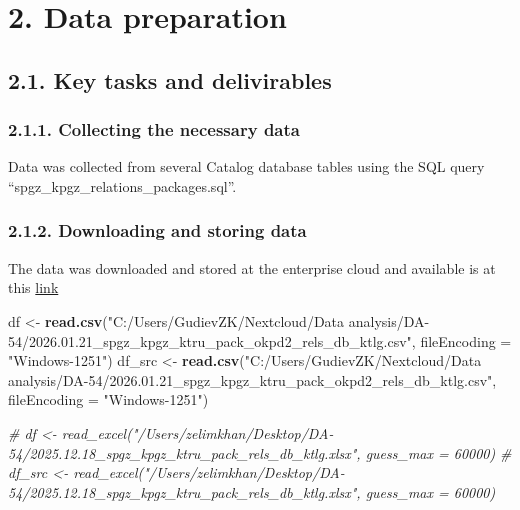 \documentclass[
]{article}
\newenvironment{Shaded}{\begin{snugshade}}{\end{snugshade}}
\newcommand{\AttributeTok}[1]{\textcolor[rgb]{0.13,0.29,0.53}{#1}}
\newcommand{\CommentTok}[1]{\textcolor[rgb]{0.56,0.35,0.01}{\textit{#1}}}
\newcommand{\FunctionTok}[1]{\textcolor[rgb]{0.13,0.29,0.53}{\textbf{#1}}}
\newcommand{\NormalTok}[1]{#1}
\newcommand{\OtherTok}[1]{\textcolor[rgb]{0.56,0.35,0.01}{#1}}
\newcommand{\StringTok}[1]{\textcolor[rgb]{0.31,0.60,0.02}{#1}}
\begin{document}
\newpage

\section{\texorpdfstring{\textbf{2. Data
preparation}}{2. Data preparation}}\label{data-preparation}

\subsection{\texorpdfstring{\textbf{2.1. Key tasks and
delivirables}}{2.1. Key tasks and delivirables}}\label{key-tasks-and-delivirables}

\subsubsection{\texorpdfstring{\textbf{2.1.1. Collecting the necessary
data}}{2.1.1. Collecting the necessary data}}\label{collecting-the-necessary-data}

Data was collected from several Catalog database tables using the SQL
query ``spgz\_kpgz\_relations\_packages.sql''.

\subsubsection{\texorpdfstring{\textbf{2.1.2. Downloading and storing
data}}{2.1.2. Downloading and storing data}}\label{downloading-and-storing-data}

The data was downloaded and stored at the enterprise cloud and available
is at this \href{https://drive.ac-mos.ru/f/4038789}{link}

\begin{Shaded}
\begin{Highlighting}[]
\NormalTok{df }\OtherTok{\textless{}{-}} \FunctionTok{read.csv}\NormalTok{(}\StringTok{"C:/Users/GudievZK/Nextcloud/Data analysis/DA{-}54/2026.01.21\_spgz\_kpgz\_ktru\_pack\_okpd2\_rels\_db\_ktlg.csv"}\NormalTok{, }\AttributeTok{fileEncoding =} \StringTok{"Windows{-}1251"}\NormalTok{)}
\NormalTok{df\_src }\OtherTok{\textless{}{-}} \FunctionTok{read.csv}\NormalTok{(}\StringTok{"C:/Users/GudievZK/Nextcloud/Data analysis/DA{-}54/2026.01.21\_spgz\_kpgz\_ktru\_pack\_okpd2\_rels\_db\_ktlg.csv"}\NormalTok{, }\AttributeTok{fileEncoding =} \StringTok{"Windows{-}1251"}\NormalTok{)}


\CommentTok{\# df \textless{}{-} read\_excel("/Users/zelimkhan/Desktop/DA{-}54/2025.12.18\_spgz\_kpgz\_ktru\_pack\_rels\_db\_ktlg.xlsx", guess\_max = 60000)}
\CommentTok{\# df\_src \textless{}{-} read\_excel("/Users/zelimkhan/Desktop/DA{-}54/2025.12.18\_spgz\_kpgz\_ktru\_pack\_rels\_db\_ktlg.xlsx", guess\_max = 60000)}
\end{Highlighting}
\end{Shaded}
\end{document}
